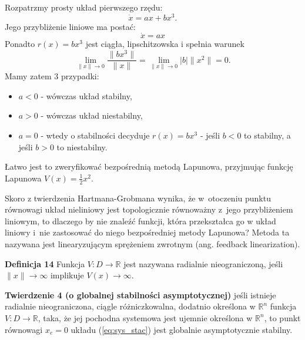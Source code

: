 \documentclass{article}
\begin{document}
\begin{tcolorbox}[colback=green!5, colframe=green!75!black, title=Przykład]
Rozpatrzmy prosty układ pierwszego rzędu:
$$
    \dot{x} = ax + bx^3.
$$
Jego przybliżenie liniowe ma postać:
$$
    \dot{x} = ax
$$
Ponadto $r(x) = bx^3$ jest ciągła, lipschitzowska i spełnia warunek
$$
    \lim_{\lVert x \rVert \rightarrow 0} \frac{\lVert bx^3 \rVert}{\lVert x \rVert} = \lim_{\lVert x \rVert \rightarrow 0} |b| \lVert x^2 \rVert = 0.
$$
Mamy zatem 3 przypadki:
\begin{itemize}
    \item $a<0$ - wówczas układ stabilny,
    \item $a>0$ - wówczas układ niestabilny,
    \item $a=0$ - wtedy o stabilności decyduje $r(x) = bx^3$ - jeśli $b<0$ to stabilny, a jeśli $b>0$ to niestabilny.
\end{itemize}
Łatwo jest to zweryfikować bezpośrednią metodą Lapunowa, przyjmując funkcję Lapunowa $V(x) = \frac{1}{2}x^{2}$.
\end{tcolorbox}

\begin{tcolorbox}[colback=orange!5, colframe=orange!75!black, title=Uwaga]
    Skoro z twierdzenia Hartmana-Grobmana wynika, że w~otoczeniu punktu
    równowagi układ nieliniowy jest topologicznie równoważny z~jego
    przybliżeniem liniowym, to dlaczego by nie znaleźć funkcji, która
    przekształca go w układ liniowy i~nie zastosować do niego bezpośredniej
    metody Lapunowa?
    Metoda ta nazywana jest linearyzującym sprężeniem zwrotnym (ang. feedback
    linearization).
\end{tcolorbox}

\textbf{Definicja 14}
Funkcja $V:D\rightarrow\mathbb{R}$ jest nazywana radialnie nieograniczoną, jeśli $\lVert x \rVert \rightarrow \infty$ implikuje $V(x) \rightarrow \infty$.

\textbf{Twierdzenie 4 (o globalnej stabilności asymptotycznej)}
jeśli istnieje radialnie nieograniczona, ciągle różniczkowalna, dodatnio określona w $\mathbb{R}^{n}$ funkcja $V: D \rightarrow \mathbb{R}$, taka, że jej pochodna systemowa jest ujemnie określona w $\mathbb{R}^{n}$, to punkt równowagi $x_{e} = 0$ układu (\ref{eq:sys_stac}) jest globalnie asymptotycznie stabilny.
\end{document}
